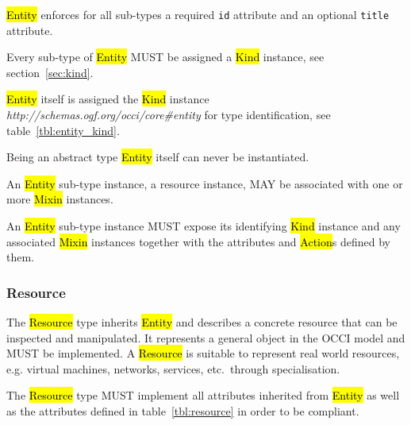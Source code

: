 \documentclass[10pt,a4paper]{article}
\begin{document}
\hl{Entity} enforces for all sub-types a required \texttt{id}
attribute and an optional \texttt{title} attribute.
 
Every sub-type of \hl{Entity} MUST be assigned a \hl{Kind} instance,
see section~\ref{sec:kind}.


\hl{Entity} itself is assigned the \hl{Kind} instance
\textit{http://schemas.ogf.org/occi/core\#entity} for type
identification, see table~\ref{tbl:entity_kind}.

Being an abstract type \hl{Entity} itself can never be instantiated.

An \hl{Entity} sub-type instance, a resource instance, MAY be associated with
one or more \hl{Mixin} instances.

An \hl{Entity} sub-type instance MUST expose its identifying \hl{Kind}
instance and any associated \hl{Mixin} instances together with the
attributes and \hl{Action}s defined by them.

\subsubsection{Resource}
\label{sec:resource}
The \hl{Resource} type inherits \hl{Entity} and describes a concrete
resource that can be inspected and manipulated. It represents a
general object in the OCCI model and MUST be implemented. A
\hl{Resource} is suitable to represent real world resources,
e.g. virtual machines, networks, services, etc.~through
specialisation.

The \hl{Resource} type MUST implement all attributes inherited from
\hl{Entity} as well as the attributes defined in
table~\ref{tbl:resource} in order to be compliant.

\end{document}
